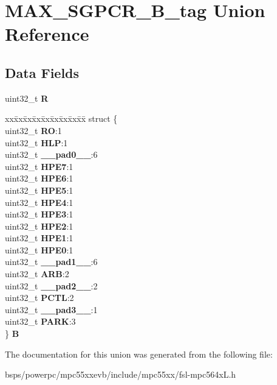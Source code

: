 \hypertarget{unionMAX__SGPCR__32B__tag}{}\section{M\+A\+X\+\_\+\+S\+G\+P\+C\+R\+\_\+B\+\_\+tag Union Reference}
\label{unionMAX__SGPCR__32B__tag}
\subsection*{Data Fields}
\begin{DoxyCompactItemize}
\item 
\mbox{\label{unionMAX__SGPCR__32B__tag_a71f8907c785772977c00a0dfdbcd3650}} 
uint32\+\_\+t {\bfseries R}
\item 
\mbox{\label{unionMAX__SGPCR__32B__tag_a2ab58b4162bf51a714b77d1bea7c4f21}} 
\begin{tabbing}
xx\=xx\=xx\=xx\=xx\=xx\=xx\=xx\=xx\=\kill
struct \{\\
\>uint32\_t {\bfseries RO}:1\\
\>uint32\_t {\bfseries HLP}:1\\
\>uint32\_t {\bfseries \_\_pad0\_\_}:6\\
\>uint32\_t {\bfseries HPE7}:1\\
\>uint32\_t {\bfseries HPE6}:1\\
\>uint32\_t {\bfseries HPE5}:1\\
\>uint32\_t {\bfseries HPE4}:1\\
\>uint32\_t {\bfseries HPE3}:1\\
\>uint32\_t {\bfseries HPE2}:1\\
\>uint32\_t {\bfseries HPE1}:1\\
\>uint32\_t {\bfseries HPE0}:1\\
\>uint32\_t {\bfseries \_\_pad1\_\_}:6\\
\>uint32\_t {\bfseries ARB}:2\\
\>uint32\_t {\bfseries \_\_pad2\_\_}:2\\
\>uint32\_t {\bfseries PCTL}:2\\
\>uint32\_t {\bfseries \_\_pad3\_\_}:1\\
\>uint32\_t {\bfseries PARK}:3\\
\} {\bfseries B}\\

\end{tabbing}\end{DoxyCompactItemize}


The documentation for this union was generated from the following file\+:\begin{DoxyCompactItemize}
\item 
bsps/powerpc/mpc55xxevb/include/mpc55xx/fsl-\/mpc564x\+L.\+h\end{DoxyCompactItemize}
